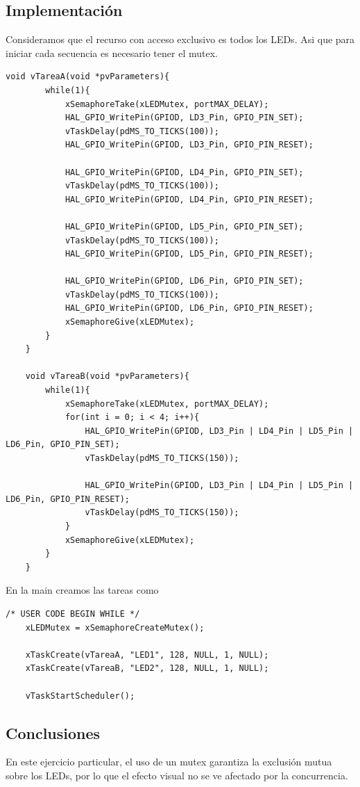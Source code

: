 \documentclass[12pt]{article}
\begin{document}
\subsection{Implementación}
Consideramos que el recurso con acceso
exclusivo es todos los LEDs. Asi que
para iniciar cada secuencia es necesario
tener el mutex.
\begin{lstlisting}[style=CStyle]
    void vTareaA(void *pvParameters){
        while(1){
            xSemaphoreTake(xLEDMutex, portMAX_DELAY);
            HAL_GPIO_WritePin(GPIOD, LD3_Pin, GPIO_PIN_SET);
            vTaskDelay(pdMS_TO_TICKS(100));
            HAL_GPIO_WritePin(GPIOD, LD3_Pin, GPIO_PIN_RESET);

            HAL_GPIO_WritePin(GPIOD, LD4_Pin, GPIO_PIN_SET);
            vTaskDelay(pdMS_TO_TICKS(100));
            HAL_GPIO_WritePin(GPIOD, LD4_Pin, GPIO_PIN_RESET);

            HAL_GPIO_WritePin(GPIOD, LD5_Pin, GPIO_PIN_SET);
            vTaskDelay(pdMS_TO_TICKS(100));
            HAL_GPIO_WritePin(GPIOD, LD5_Pin, GPIO_PIN_RESET);

            HAL_GPIO_WritePin(GPIOD, LD6_Pin, GPIO_PIN_SET);
            vTaskDelay(pdMS_TO_TICKS(100));
            HAL_GPIO_WritePin(GPIOD, LD6_Pin, GPIO_PIN_RESET);
            xSemaphoreGive(xLEDMutex);
        }
    }

    void vTareaB(void *pvParameters){
        while(1){
            xSemaphoreTake(xLEDMutex, portMAX_DELAY);
            for(int i = 0; i < 4; i++){
                HAL_GPIO_WritePin(GPIOD, LD3_Pin | LD4_Pin | LD5_Pin | LD6_Pin, GPIO_PIN_SET);
                vTaskDelay(pdMS_TO_TICKS(150));

                HAL_GPIO_WritePin(GPIOD, LD3_Pin | LD4_Pin | LD5_Pin | LD6_Pin, GPIO_PIN_RESET);
                vTaskDelay(pdMS_TO_TICKS(150));
            }
            xSemaphoreGive(xLEDMutex);
        }
    }
\end{lstlisting}
\pagebreak
En la main creamos las tareas como
\begin{lstlisting}[style=CStyle]
    /* USER CODE BEGIN WHILE */
    xLEDMutex = xSemaphoreCreateMutex();
  
    xTaskCreate(vTareaA, "LED1", 128, NULL, 1, NULL);
    xTaskCreate(vTareaB, "LED2", 128, NULL, 1, NULL);
  
    vTaskStartScheduler();

\end{lstlisting}

\subsection{Conclusiones}
En este ejercicio particular, el uso de
un mutex garantiza la exclusión mutua
sobre los LEDs, por lo que
el efecto visual no se ve afectado
por la concurrencia.
\end{document}
